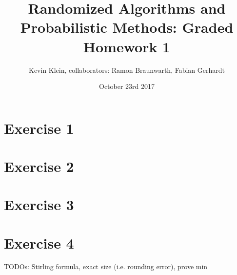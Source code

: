 \documentclass[a4paper,german]{article}
\title{Randomized Algorithms and Probabilistic Methods: Graded Homework 1}
\author{ Kevin Klein, collaborators: Ramon Braunwarth, Fabian Gerhardt}
\date{October 23rd 2017}
\begin{document}
\maketitle

\section*{Exercise 1}
\section*{Exercise 2}
\section*{Exercise 3}
\section*{Exercise 4}
TODOs: Stirling formula, exact size (i.e. rounding error), prove min
\end{document}
